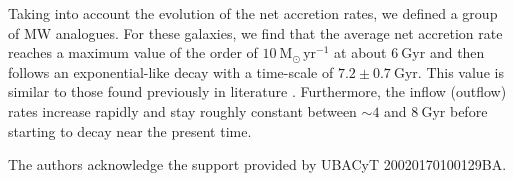 \documentclass[baaa]{baaa}
\begin{document}
Taking into account the evolution of the net accretion rates, we defined a group of MW analogues.
For these galaxies, we find that the average net accretion rate reaches a maximum value of the order of $10~\mathrm{M}_\odot \, \mathrm{yr}^{-1}$ at about $6~\mathrm{Gyr}$ and then follows an exponential-like decay with a time-scale of $7.2 \pm 0.7 ~\mathrm{Gyr}$.
This value is similar to those found previously in literature \citep[e.g.][]{Nuza2019}.
Furthermore, the inflow (outflow) rates increase rapidly and stay roughly constant between $\sim 4$ and $8~\mathrm {Gyr}$ before starting to decay near the present time. 


\begin{acknowledgement}
The authors acknowledge the support provided by UBACyT 20020170100129BA.
\end{acknowledgement}




\small

\end{document}
